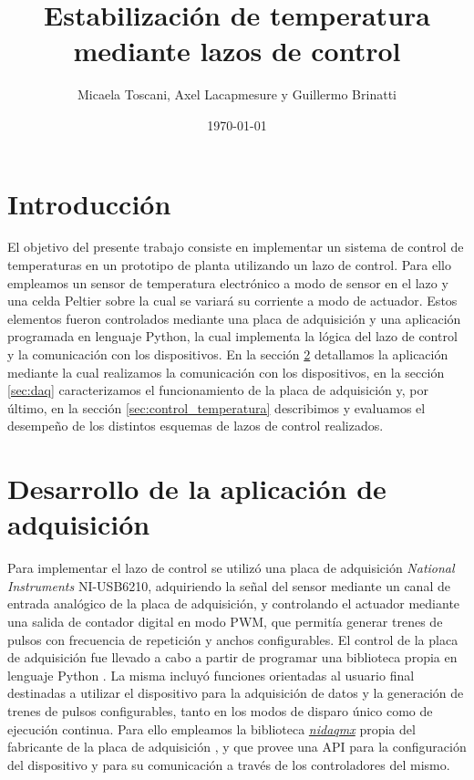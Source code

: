 \documentclass[a4paper,11pt]{article}
\title{Estabilización de temperatura mediante lazos de control}
\date{\today}
\author{Micaela Toscani, Axel Lacapmesure y Guillermo Brinatti}
\begin{document}
\maketitle



\section{Introducción}

El objetivo del presente trabajo consiste en implementar un sistema de control de temperaturas en un prototipo de planta utilizando un lazo de control. Para ello empleamos un sensor de temperatura electrónico a modo de sensor en el lazo y una celda Peltier sobre la cual se variará su corriente a modo de actuador. Estos elementos fueron controlados mediante una placa de adquisición y una aplicación programada en lenguaje Python, la cual implementa la lógica del lazo de control y la comunicación con los dispositivos. En la sección \ref{sec:software} detallamos la aplicación mediante la cual realizamos la comunicación con los dispositivos, en la sección \ref{sec:daq} caracterizamos el funcionamiento de la placa de adquisición y, por último, en la sección \ref{sec:control_temperatura} describimos y evaluamos el desempeño de los distintos esquemas de lazos de control realizados.

\section{Desarrollo de la aplicación de adquisición}
\label{sec:software}

Para implementar el lazo de control se utilizó una placa de adquisición \emph{National Instruments} NI-USB6210, adquiriendo la señal del sensor mediante un canal de entrada analógico de la placa de adquisición, y controlando el actuador mediante una salida de contador digital en modo PWM, que permitía generar trenes de pulsos con frecuencia de repetición y anchos configurables.	El control de la placa de adquisición fue llevado a cabo a partir de programar una biblioteca propia en lenguaje Python \cite{repo}. La misma incluyó funciones orientadas al usuario final destinadas a utilizar el dispositivo para la adquisición de datos y la generación de trenes de pulsos configurables, tanto en los modos de disparo único como de ejecución continua. Para ello empleamos la biblioteca \emph{\href{https://nidaqmx-python.readthedocs.io}{nidaqmx}} propia del fabricante de la placa de adquisición \cite{nidaqmx}, y que provee una API para la configuración del dispositivo y para su comunicación a través de los controladores del mismo.
	
\end{document}
